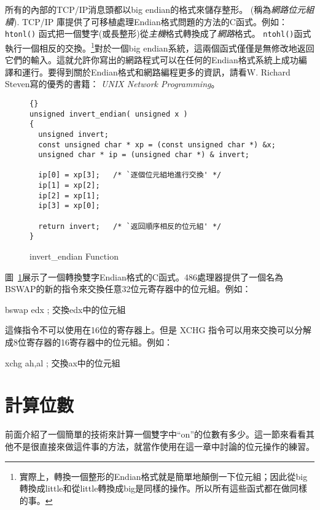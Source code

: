 所有的內部的TCP/IP消息頭都以big endian的格式來儲存整形。
(稱為\emph{網路位元組續}). TCP/IP 庫提供了可移植處理Endian格式問題的方法的C函式。例如：\lstinline|htonl()| 函式把一個雙字(或長整形)從\emph{主機}格式轉換成了\emph{網路}格式。
\lstinline|ntohl()|函式執行一個相反的交換。\footnote{實際上，轉換一個整形的Endian格式就是簡單地顛倒一下位元組；因此從big轉換成little和從little轉換成big是同樣的操作。所以所有這些函式都在做同樣的事。}對於一個big endian系統，這兩個函式僅僅是無修改地返回它們的輸入。這就允許你寫出的網路程式可以在任何的Endian格式系統上成功編譯和運行。要得到關於Endian格式和網路編程更多的資訊，請看W. Richard Steven寫的優秀的書籍：
\emph{UNIX Network Programming}。

\begin{figure}[t]
\lstset{escapeinside=`',language=Pascal,%
}
\begin{lstlisting}[frame=tlrb]{}
unsigned invert_endian( unsigned x )
{
  unsigned invert;
  const unsigned char * xp = (const unsigned char *) &x;
  unsigned char * ip = (unsigned char *) & invert;

  ip[0] = xp[3];   /* `逐個位元組地進行交換' */
  ip[1] = xp[2];
  ip[2] = xp[1];
  ip[3] = xp[0];

  return invert;   /* `返回順序相反的位元組' */
}
\end{lstlisting}
\caption{invert\_endian Function \label{fig:invertEndian}}
\end{figure}

圖~\ref{fig:invertEndian}展示了一個轉換雙字Endian格式的C函式。486處理器提供了一個名為{\code
BSWAP}的新的指令來交換任意32位元寄存器中的位元組。例如：
\begin{AsmCodeListing}[frame=none,numbers=none]
      bswap   edx          ; 交換edx中的位元組
\end{AsmCodeListing}
這條指令不可以使用在16位的寄存器上。但是
{\code XCHG} 指令可以用來交換可以分解成8位寄存器的16寄存器中的位元組。例如：
\begin{AsmCodeListing}[frame=none,numbers=none]
      xchg    ah,al        ; 交換ax中的位元組
\end{AsmCodeListing}

\section{計算位數}

前面介紹了一個簡單的技術來計算一個雙字中``on''的位數有多少。這一節來看看其他不是很直接來做這件事的方法，就當作使用在這一章中討論的位元操作的練習。


